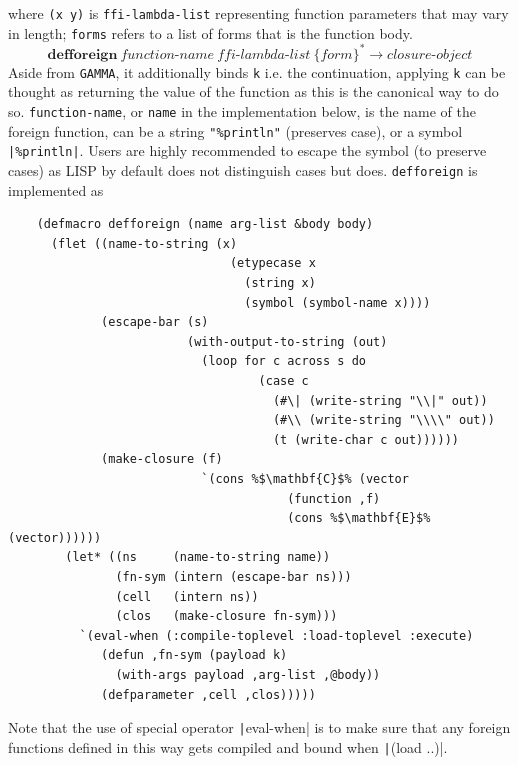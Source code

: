 \documentclass[a4paper, 11pt]{article}
\theoremstyle{remark}\newtheorem*{remark}{Remark}
\theoremstyle{definition}\newtheorem*{definition}{Definition}
\begin{document}
\begin{itemize}
{    where \texttt{(x y)} is \texttt{ffi-lambda-list} representing
    function parameters that may vary in length;
    \texttt{forms} refers to a list of forms
    that is the function body.
  }
  \[
    \mathbf{defforeign}\ \textit{function-name}\ \textit{ffi-lambda-list}\ \{\textit{form}\}^*\longrightarrow \textit{closure-object}
  \]
  Aside from \texttt{GAMMA}, it additionally binds \texttt{k} i.e. the continuation,
  applying \texttt{k} can be thought as returning the value of the function as this is the canonical way to do so.
  \texttt{function-name}, or \texttt{name} in the implementation below, is the name of the foreign function, can be a string \texttt{"\%println"} (preserves case), or a symbol \texttt{|\%println|}.
  Users are highly recommended to escape the symbol (to preserve cases)
  as LISP by default does not distinguish cases but
  \Tigris does.
  \texttt{defforeign} is implemented as
  \begin{verbatim}
    (defmacro defforeign (name arg-list &body body)
      (flet ((name-to-string (x)
                               (etypecase x
                                 (string x)
                                 (symbol (symbol-name x))))
             (escape-bar (s)
                         (with-output-to-string (out)
                           (loop for c across s do
                                   (case c
                                     (#\| (write-string "\\|" out))
                                     (#\\ (write-string "\\\\" out))
                                     (t (write-char c out))))))
             (make-closure (f)
                           `(cons %$\mathbf{C}$% (vector
                                       (function ,f)
                                       (cons %$\mathbf{E}$% (vector))))))
        (let* ((ns     (name-to-string name))
               (fn-sym (intern (escape-bar ns)))
               (cell   (intern ns))
               (clos   (make-closure fn-sym)))
          `(eval-when (:compile-toplevel :load-toplevel :execute)
             (defun ,fn-sym (payload k)
               (with-args payload ,arg-list ,@body))
             (defparameter ,cell ,clos)))))
  \end{verbatim}
  Note that the use of special operator \texttt|eval-when| is to make sure that any
  foreign functions defined in this way gets compiled and bound when \texttt|(load ..)|.
\end{itemize}
\end{document}

